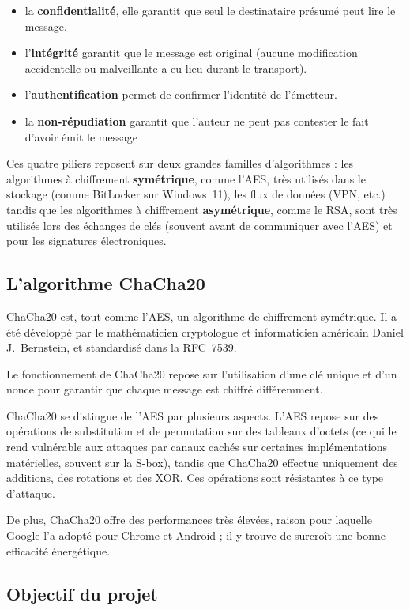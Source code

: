 \documentclass[12pt, a4paper]{article}
\begin{document}
\begin{itemize}
  \item la \textbf{confidentialité}, elle garantit que seul le destinataire présumé peut lire
        le message.
  \item l'\textbf{intégrité} garantit que le message est original (aucune modification
        accidentelle ou malveillante a eu lieu durant le transport).
  \item l'\textbf{authentification} permet de confirmer l'identité de l'émetteur.
  \item la \textbf{non-répudiation} garantit que l'auteur ne peut pas contester le fait d'avoir émit le message
\end{itemize}

Ces quatre piliers reposent sur deux grandes familles d'algorithmes : les algorithmes à
chiffrement \textbf{symétrique}, comme l'AES, très utilisés dans le stockage (comme BitLocker
sur Windows~11), les flux de données (VPN, etc.) tandis que les algorithmes à chiffrement
\textbf{asymétrique}, comme le RSA, sont très utilisés lors des échanges de clés (souvent avant
de communiquer avec l'AES) et pour les signatures électroniques.

\subsection{L'algorithme ChaCha20}

ChaCha20 est, tout comme l'AES, un algorithme de chiffrement symétrique. Il a été développé par
le mathématicien cryptologue et informaticien américain Daniel J.~Bernstein,
et standardisé dans la RFC~7539.

Le fonctionnement de ChaCha20 repose sur l'utilisation d'une clé unique et d'un nonce  pour garantir que chaque message est chiffré différemment. 

ChaCha20 se distingue de l'AES par plusieurs aspects. L'AES repose sur des opérations de
substitution et de permutation sur des tableaux d'octets (ce qui le rend vulnérable aux
attaques par canaux cachés sur certaines implémentations matérielles, souvent sur la S-box),
tandis que ChaCha20 effectue uniquement des additions, des rotations et des XOR. Ces opérations
sont résistantes à ce type d'attaque.

De plus, ChaCha20 offre des performances très élevées, raison pour laquelle Google l'a adopté
pour Chrome et Android ; il y trouve de surcroît une bonne efficacité
énergétique.

\subsection{Objectif du projet}
\end{document}
